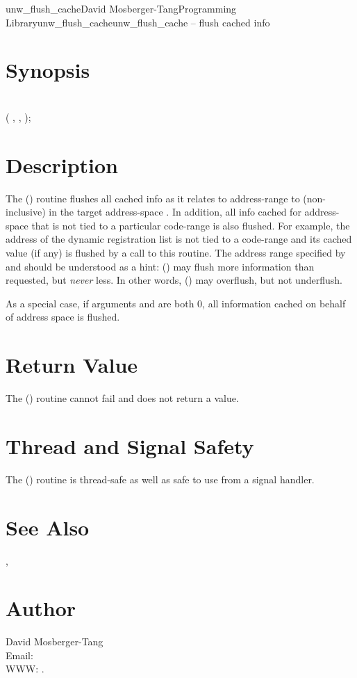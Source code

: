 \documentclass{article}
\begin{document}
\begin{Name}{3}{unw\_flush\_cache}{David Mosberger-Tang}{Programming Library}{unw\_flush\_cache}unw\_flush\_cache -- flush cached info
\end{Name}

\section{Synopsis}

\\

 ( ,  ,  );\\

\section{Description}

The () routine flushes all cached info as it
relates to address-range  to  (non-inclusive) in the
target address-space .  In addition, all info cached for
address-space  that is not tied to a particular code-range is
also flushed.  For example, the address of the dynamic registration
list is not tied to a code-range and its cached value (if any) is
flushed by a call to this routine.  The address range specified by
 and  should be understood as a hint:
() may flush more information than requested,
but \emph{never} less.  In other words, () may
overflush, but not underflush.

As a special case, if arguments  and  are both 0, all
information cached on behalf of address space  is flushed.

\section{Return Value}

The () routine cannot fail and does not
return a value.

\section{Thread and Signal Safety}

The () routine is thread-safe as well as safe to
use from a signal handler.

\section{See Also}

,

\section{Author}

\noindent
David Mosberger-Tang\\
Email: \\
WWW: .
\LatexManEnd
\end{document}
